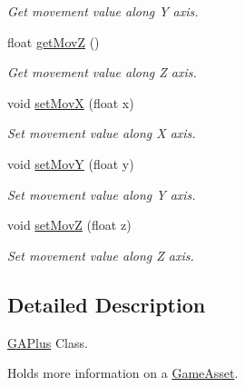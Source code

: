 \begin{DoxyCompactItemize}
\begin{DoxyCompactList}\small\item\em Get movement value along Y axis. \end{DoxyCompactList}\item 
\hypertarget{classGAPlus_abaa790b578ae3f93c341f1d3badaa5ed}{float \hyperlink{classGAPlus_abaa790b578ae3f93c341f1d3badaa5ed}{get\-Mov\-Z} ()}\label{classGAPlus_abaa790b578ae3f93c341f1d3badaa5ed}

\begin{DoxyCompactList}\small\item\em Get movement value along Z axis. \end{DoxyCompactList}\item 
\hypertarget{classGAPlus_a2e58d254ad8a5b25d9de8fdaab3ab4b7}{void \hyperlink{classGAPlus_a2e58d254ad8a5b25d9de8fdaab3ab4b7}{set\-Mov\-X} (float x)}\label{classGAPlus_a2e58d254ad8a5b25d9de8fdaab3ab4b7}

\begin{DoxyCompactList}\small\item\em Set movement value along X axis. \end{DoxyCompactList}\item 
\hypertarget{classGAPlus_a742b62c8fb4cbc9644c396226448f7e8}{void \hyperlink{classGAPlus_a742b62c8fb4cbc9644c396226448f7e8}{set\-Mov\-Y} (float y)}\label{classGAPlus_a742b62c8fb4cbc9644c396226448f7e8}

\begin{DoxyCompactList}\small\item\em Set movement value along Y axis. \end{DoxyCompactList}\item 
\hypertarget{classGAPlus_aec3ef9cf7ffbaeeee2c9837e5734a880}{void \hyperlink{classGAPlus_aec3ef9cf7ffbaeeee2c9837e5734a880}{set\-Mov\-Z} (float z)}\label{classGAPlus_aec3ef9cf7ffbaeeee2c9837e5734a880}

\begin{DoxyCompactList}\small\item\em Set movement value along Z axis. \end{DoxyCompactList}\end{DoxyCompactItemize}


\subsection{Detailed Description}
\hyperlink{classGAPlus}{G\-A\-Plus} Class. 

Holds more information on a \hyperlink{classGameAsset}{Game\-Asset}. 

